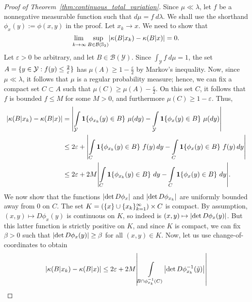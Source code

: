 \documentclass[11pt,onecolumn]{IEEEtran}  %
\newcommand{\Sb}{\mathbb{S}}
\newcommand{\Bc}{\mathcal{B}}
\newcommand{\Yc}{\mathcal{Y}}
\newcommand{\one}[1]{\mathbf{1}\set{#1}}
\newcommand{\defeq}{:=}%
\DeclarePairedDelimiter{\set}{\{}{\}}
\DeclarePairedDelimiter{\abs}{|}{|}
\theoremstyle{definition}
\begin{document}
\begin{proof}[{Proof of Theorem~\ref{thm:continuous_total_variation}}]
    Since $\mu \ll \lambda$, let $f$ be a nonnegative measurable function such that $d\mu = f \ d\lambda$. We shall use the shorthand $\phi_x(y) \defeq \phi(x,y)$ in the proof.
    Let $x_k \to x$. We need to show that
    \begin{equation}
        \adjustlimits\lim_{k \to \infty} \sup_{B \in \Bc(\Sb_2)} \abs{\kappa(B|x_k) - \kappa(B|x)} = 0.
    \end{equation}
    Let $\varepsilon > 0$ be arbitrary, and let $B \in \Bc(\Yc)$. Since $\int_{\Yc} f \ d\mu = 1$, the set $A = \set{y \in \Yc : f(y) \leq \frac{2}{\varepsilon}}$ has $\mu(A) \geq 1-\frac{\varepsilon}{2}$ by Markov's inequality. Now, since $\mu \ll \lambda$, it follows that $\mu$ is a regular probability measure; hence, we can fix a compact set $C \subset A$ such that $\mu(C) \geq \mu(A) - \frac{\varepsilon}{2}$. On this set $C$, it follows that $f$ is bounded $f \leq M$ for some $M > 0$, and furthermore $\mu(C) \geq 1-\varepsilon$. Thus,
    \begin{align*}
        \abs*{\kappa(B|x_k) - \kappa(B|x)} &=
        \abs*{
            \int\limits_{\Yc} \one{\phi_{x_k}(y) \in B} \ \mu(dy) -
            \int\limits_{\Yc} \one{\phi_{x}(y) \in B} \ \mu(dy)
        } \\
        &\leq 2\varepsilon +
        \abs*{
            \int\limits_{C} \one{\phi_{x_k}(y) \in B} \ f(y)\, dy -
            \int\limits_{C} \one{\phi_{x}(y) \in B} \ f(y)\, dy
        } \\
        &\leq 2\varepsilon +
        2M\abs*{
            \int\limits_{C} \one{\phi_{x_k}(y) \in B} \ dy -
            \int\limits_{C} \one{\phi_{x}(y) \in B} \ dy
        }.
    \end{align*}
    We now show that the functions $\abs{\det D \phi_{x}}$ and $\abs{\det D\phi_{x_k}}$ are uniformly bounded away from $0$ on $C$. The set $K = (\set{x} \cup \set{x_k}_{k=1}^\infty) \times C$ is compact. By assumption, $(x,y) \mapsto D \phi_x(y)$ is continuous on $K$, so indeed is $(x,y) \mapsto \abs{\det D \phi_x(y)}$. But this latter function is strictly positive on $K$, and since $K$ is compact, we can fix $\beta > 0$ such that $\abs{\det D \phi_x(y)} \geq \beta$ for all $(x,y) \in K$. Now, let us use change-of-coordinates to obtain
    \begin{align*}
        \abs*{\kappa(B|x_k) - \kappa(B|x)} \leq 2\varepsilon
        +2M\abs*{
            \int\limits_{B \cap \phi^{-1}_{x_k}(C)}
            \abs*{\det D \phi^{-1}_{x_k}(\tilde y)}
}
\end{align*}
\end{proof}
\end{document}
